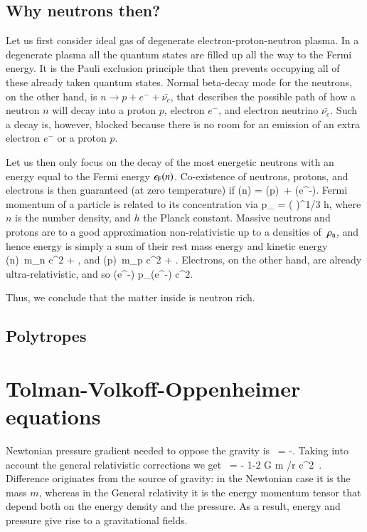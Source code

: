 \subsection{Why neutrons then?}
Let us first consider ideal gas of degenerate electron-proton-neutron plasma.
In a degenerate plasma all the quantum states are filled up all the way to the Fermi energy.
It is the Pauli exclusion principle that then prevents occupying all of these already taken quantum states.
Normal beta-decay mode for the neutrons, on the other hand, is $n \rightarrow p + e^{-} + \bar{\nu_{e}}$, that describes the possible path of how a neutron $n$ will decay into a proton $p$, electron $e^{-}$, and electron neutrino $\bar{\nu_{e}}$.
Such a decay is, however, blocked because there is no room for an emission of an extra electron $e^{-}$ or a proton $p$.\cite[see e.g.][]{Phillips94}

Let us then only focus on the decay of the most energetic neutrons with an energy equal to the Fermi energy $\epsilon_{\mathrm{F}} (n)$.
Co-existence of neutrons, protons, and electrons is then guaranteed (at zero temperature) if 
\be
\ef(n) = \ef(p) + \ef(e^{-}).
\ee
Fermi momentum of a particle is related to its concentration via
\be
p_{} = \left(  \right)^{1/3} h,
\ee
where $n$ is the number density, and $h$ the Planck constant.
Massive neutrons and protons are to a good approximation non-relativistic up to a densities of $\, \rho_{\mathrm{n}} $, and hence energy is simply a sum of their rest mass energy and kinetic energy
\be
\ef(n) \approx m_n c^2 + ,
\ee
and
\be
\ef(p) \approx m_p c^2 + .
\ee
Electrons, on the other hand, are already ultra-relativistic, and so
\be
\ef(e^{-}) \approx p_{}(e^{-}) c^2.
\ee

Thus, we conclude that the matter inside is neutron rich.


\subsection{Polytropes}



\section{Tolman-Volkoff-Oppenheimer equations}
Newtonian pressure gradient needed to oppose the gravity is
\be
{} = -.
\ee
Taking into account the general relativistic corrections we get
\be
{} = 
    - \times 
    {1-2 G m /r c^2 }.
\ee
Difference originates from the source of gravity:
in the Newtonian case it is the mass $m$, whereas in the General relativity it is the energy momentum tensor that depend both on the energy density and the pressure.
As a result, energy and pressure give rise to a gravitational fields.

